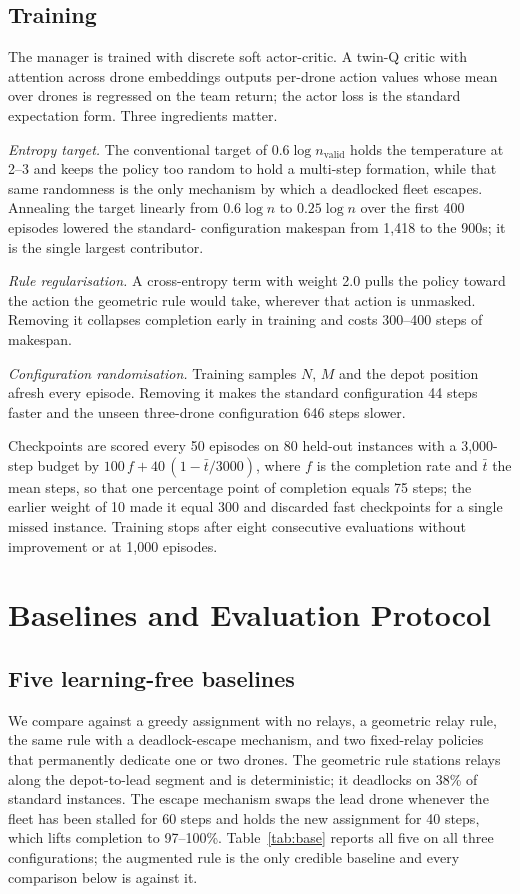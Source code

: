 \documentclass[12pt]{article}
\begin{document}
\subsection{Training}

The manager is trained with discrete soft actor-critic. A twin-Q critic with attention across
drone embeddings outputs per-drone action values whose mean over drones is regressed on the
team return; the actor loss is the standard expectation form. Three ingredients matter.

\emph{Entropy target.} The conventional target of $0.6 \log n_{\mathrm{valid}}$ holds the
temperature at 2--3 and keeps the policy too random to hold a multi-step formation, while that
same randomness is the only mechanism by which a deadlocked fleet escapes. Annealing the target
linearly from $0.6 \log n$ to $0.25 \log n$ over the first 400 episodes lowered the standard-
configuration makespan from 1{,}418 to the 900s; it is the single largest contributor.

\emph{Rule regularisation.} A cross-entropy term with weight 2.0 pulls the policy toward the
action the geometric rule would take, wherever that action is unmasked. Removing it collapses
completion early in training and costs 300--400 steps of makespan.

\emph{Configuration randomisation.} Training samples $N$, $M$ and the depot position afresh
every episode. Removing it makes the standard configuration 44 steps faster and the unseen
three-drone configuration 646 steps slower.

Checkpoints are scored every 50 episodes on 80 held-out instances with a 3{,}000-step budget by
$100\,f + 40\,(1 - \bar{t}/3000)$, where $f$ is the completion rate and $\bar{t}$ the mean steps,
so that one percentage point of completion equals 75 steps; the earlier weight of 10 made it
equal 300 and discarded fast checkpoints for a single missed instance. Training stops after
eight consecutive evaluations without improvement or at 1{,}000 episodes.

\section{Baselines and Evaluation Protocol}

\subsection{Five learning-free baselines}

We compare against a greedy assignment with no relays, a geometric relay rule, the same rule with
a deadlock-escape mechanism, and two fixed-relay policies that permanently dedicate one or two
drones. The geometric rule stations relays along the depot-to-lead segment and is deterministic;
it deadlocks on 38\% of standard instances. The escape mechanism swaps the lead drone whenever the
fleet has been stalled for 60 steps and holds the new assignment for 40 steps, which lifts
completion to 97--100\%. Table~\ref{tab:base} reports all five on all three configurations; the
augmented rule is the only credible baseline and every comparison below is against it.
\end{document}
